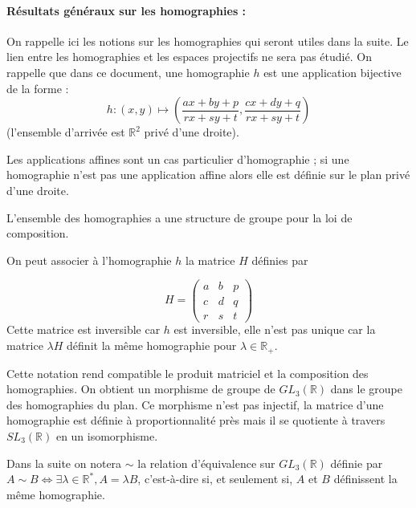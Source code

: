 \paragraph{Résultats généraux sur les homographies :}
 On rappelle ici les notions sur les homographies qui seront utiles dans la suite. Le lien entre les homographies et les espaces projectifs ne sera pas étudié. On rappelle que dans ce document, une homographie $h$ est une application bijective de la forme :
	\[h:(x,y)\mapsto \left(\frac{ax+by+p}{rx+sy+t},\frac{cx+dy+q}{rx+sy+t}\right)\]
(l'ensemble d'arrivée est $\mathbb R^2$ privé d'une droite).

Les applications affines sont un cas particulier d'homographie ; si une homographie n'est pas une application affine alors elle est définie sur le plan privé d'une droite.

L'ensemble des homographies a une structure de groupe pour la loi de composition.

On peut  associer à l'homographie $h$ la matrice $H$ définies par
  
\begin{equation*}
	H=\begin{pmatrix}
	a&b&p\\c&d&q\\r&s&t
	\end{pmatrix}
\end{equation*}
Cette matrice est inversible car $h$ est inversible, elle n'est pas unique car la matrice $\lambda H$ définit la même homographie pour $\lambda \in \mathbb{R}_+$.

Cette notation rend compatible le produit matriciel et la composition des homographies. On obtient un morphisme de groupe de $GL_{3}(\mathbb{R})$ dans le groupe des homographies du plan. Ce morphisme n'est pas injectif, la matrice d'une homographie est définie à proportionnalité près mais il se quotiente à travers $SL_{3}(\mathbb{R})$ en un isomorphisme.

Dans la suite on notera $\sim$ la relation d'équivalence  sur $GL_{3}(\mathbb{R})$ définie par $A\sim B \iff \exists \lambda\in \mathbb{R}^{*} , A=\lambda B$, c'est-à-dire si, et seulement si, $A$ et $B$ définissent la même homographie.

